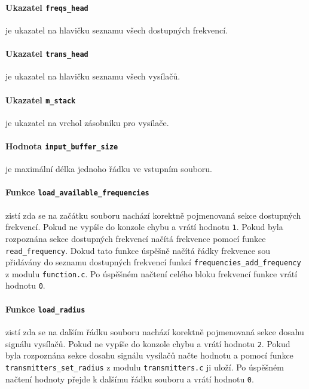 \documentclass[12pt]{report}
\begin{document}
\cprotect\paragraph{Ukazatel \verb|freqs_head|}
je ukazatel na hlavičku seznamu všech dostupných frekvencí.

\cprotect\paragraph{Ukazatel \verb|trans_head|}
je ukazatel na hlavičku seznamu všech vysílačů.

\cprotect\paragraph{Ukazatel \verb|m_stack|}
je ukazatel na vrchol zásobníku pro vysílače.

\cprotect\paragraph{Hodnota \verb|input_buffer_size|}
je maximální délka jednoho řádku ve vstupním souboru.

\cprotect\paragraph{Funkce \verb|load_available_frequencies|}
zistí zda se na začátku souboru nachází korektně pojmenovaná sekce dostupných frekvencí. Pokud ne vypíše do konzole chybu a vrátí hodnotu \texttt{1}. Pokud byla rozpoznána sekce dostupných frekvencí načítá frekvence pomocí funkce \verb|read_frequency|. Dokud tato funkce úspěšně načítá řádky frekvence sou přidávány do seznamu dostupných frekvencí funkcí \verb|frequencies_add_frequency| z modulu \texttt{function.c}. Po úspěšném načtení celého bloku frekvencí funkce vrátí hodnotu \texttt{0}.

\cprotect\paragraph{Funkce \verb|load_radius|}
zistí zda se na dalším řádku souboru nachází korektně pojmenovaná sekce dosahu signálu vysílačů. Pokud ne vypíše do konzole chybu a vrátí hodnotu \texttt{2}. Pokud byla rozpoznána sekce dosahu signálu vysílačů načte hodnotu a pomocí funkce \verb|transmitters_set_radius| z modulu \texttt{transmitters.c} ji uloží. Po úspěšném načtení hodnoty přejde k dalšímu řádku souboru a vrátí hodnotu \texttt{0}.
\end{document}
